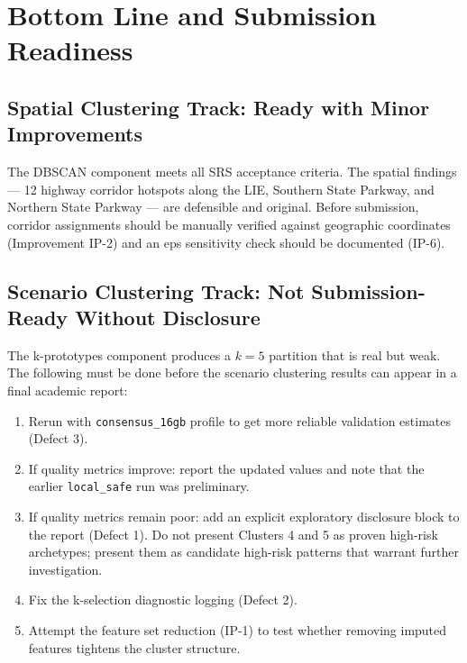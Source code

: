 \documentclass[11pt]{article}
\begin{document}
\section{Bottom Line and Submission Readiness}

\subsection{Spatial Clustering Track: Ready with Minor Improvements}

The DBSCAN component meets all SRS acceptance criteria. The spatial findings ---
12 highway corridor hotspots along the LIE, Southern State Parkway, and Northern
State Parkway --- are defensible and original. Before submission, corridor
assignments should be manually verified against geographic coordinates
(Improvement IP-2) and an eps sensitivity check should be documented (IP-6).

\subsection{Scenario Clustering Track: Not Submission-Ready Without Disclosure}

The k-prototypes component produces a $k=5$ partition that is real but weak.
The following must be done before the scenario clustering results can appear
in a final academic report:

\begin{enumerate}
\item Rerun with \texttt{consensus\_16gb} profile to get more reliable
  validation estimates (Defect 3).
\item If quality metrics improve: report the updated values and note that
  the earlier \texttt{local\_safe} run was preliminary.
\item If quality metrics remain poor: add an explicit exploratory disclosure
  block to the report (Defect 1). Do not present Clusters 4 and 5 as
  proven high-risk archetypes; present them as candidate high-risk patterns
  that warrant further investigation.
\item Fix the k-selection diagnostic logging (Defect 2).
\item Attempt the feature set reduction (IP-1) to test whether removing
  imputed features tightens the cluster structure.
\end{enumerate}
\end{document}
